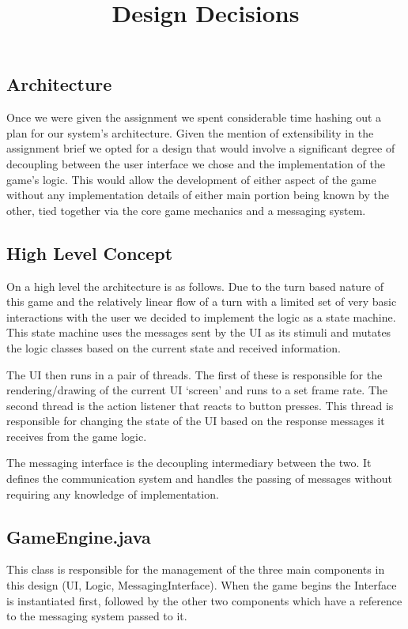 \documentclass[a4paper, 11pt]{article}
\title{Design Decisions}
\begin{document}
	\maketitle
	\subsection*{Architecture}
	Once we were given the assignment we spent considerable time hashing out a plan for our system's architecture. Given the mention of extensibility in the assignment brief we opted for a design that would involve a significant degree of decoupling between the user interface we chose and the implementation of the game's logic. This would allow the development of either aspect of the game without any implementation details of either main portion being known by the other, tied together via the core game mechanics and a messaging system.
	\subsection*{High Level Concept}
	On a high level the architecture is as follows. Due to the turn based nature of this game and the relatively linear flow of a turn with a limited set of very basic interactions with the user we decided to implement the logic as a state machine. This state machine uses the messages sent by the UI as its stimuli and mutates the logic classes based on the current state and received information.\par 
	\noindent The UI then runs in a pair of threads. The first of these is responsible for the rendering/drawing of the current UI `screen' and runs to a set frame rate. The second thread is the action listener that reacts to button presses. This thread is responsible for changing the state of the UI based on the response messages it receives from the game logic.\par 
	\noindent The messaging interface is the decoupling intermediary between the two. It defines the communication system and handles the passing of messages without requiring any knowledge of implementation.
	
	\subsection*{GameEngine.java}
	This class is responsible for the management of the three main components in this design (UI, Logic, MessagingInterface). %
	When the game begins the Interface is instantiated first, followed by the other two components which have a reference to the messaging system passed to it.
		
\end{document}
